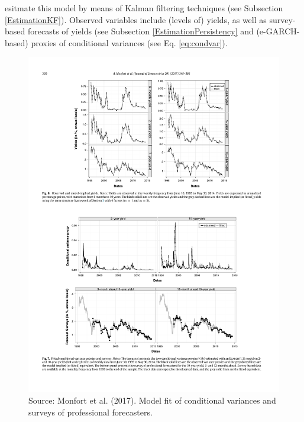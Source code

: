 \documentclass[
  12pt,
]{book}
\theoremstyle{definition}
\theoremstyle{definition}
\theoremstyle{definition}
\theoremstyle{definition}
\theoremstyle{remark}
\begin{document}
\citet{zarg_2017} esitmate this model by means of Kalman filtering techniques (see Subsection \ref{EstimationKF}). Observed variables include (levels of) yields, as well as survey-based forecasts of yields (see Subsection \ref{EstimationPersistency} and (e-GARCH-based) proxies of conditional variances (see Eq. \eqref{eq:condvar}).

\begin{figure}

{\centering \includegraphics[width=0.95\linewidth]{figures/Figure_fit_ZARG} 

}

\caption{Source: Monfort et al. (2017). Model fit of conditional variances and surveys of professional forecasters.}\label{fig:fitZarg}
\end{figure}
\end{document}
